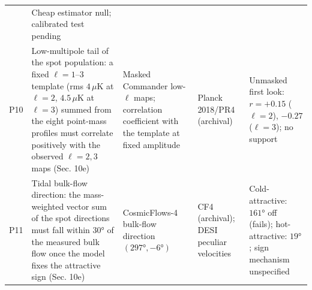\documentclass[
]{article}
\begin{document}
\begin{longtable}[]{@{}lllll@{}}
\begin{minipage}[t]{0.19\columnwidth}
\end{minipage} & \begin{minipage}[t]{0.19\columnwidth}\raggedright
Cheap estimator null; calibrated test pending\strut
\end{minipage}\tabularnewline
\begin{minipage}[t]{0.11\columnwidth}\raggedright
P10\strut
\end{minipage} & \begin{minipage}[t]{0.19\columnwidth}\raggedright
Low-multipole tail of the spot population: a fixed \(\ell = 1\)--\(3\)
template (rms \(4\,\mu\)K at \(\ell = 2\), \(4.5\,\mu\)K at
\(\ell = 3\)) summed from the eight point-mass profiles must correlate
positively with the observed \(\ell = 2, 3\) maps (Sec. 10e)\strut
\end{minipage} & \begin{minipage}[t]{0.19\columnwidth}\raggedright
Masked Commander low-\(\ell\) maps; correlation coefficient with the
template at fixed amplitude\strut
\end{minipage} & \begin{minipage}[t]{0.19\columnwidth}\raggedright
Planck 2018/PR4 (archival)\strut
\end{minipage} & \begin{minipage}[t]{0.19\columnwidth}\raggedright
Unmasked first look: \(r = +0.15\) (\(\ell=2\)), \(-0.27\) (\(\ell=3\));
no support\strut
\end{minipage}\tabularnewline
\begin{minipage}[t]{0.11\columnwidth}\raggedright
P11\strut
\end{minipage} & \begin{minipage}[t]{0.19\columnwidth}\raggedright
Tidal bulk-flow direction: the mass-weighted vector sum of the spot
directions must fall within \(30°\) of the measured bulk flow once the
model fixes the attractive sign (Sec. 10e)\strut
\end{minipage} & \begin{minipage}[t]{0.19\columnwidth}\raggedright
CosmicFlows-4 bulk-flow direction \((297°, -6°)\)\strut
\end{minipage} & \begin{minipage}[t]{0.19\columnwidth}\raggedright
CF4 (archival); DESI peculiar velocities\strut
\end{minipage} & \begin{minipage}[t]{0.19\columnwidth}\raggedright
Cold-attractive: \(161°\) off (fails); hot-attractive: \(19°\); sign
mechanism unspecified\strut
\end{minipage}\tabularnewline
\bottomrule
\end{longtable}
\end{document}
